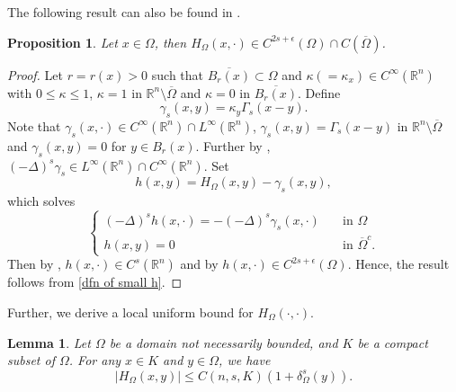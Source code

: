 \documentclass{amsart}
\newtheorem{lemma}[theorem]{Lemma}
\newtheorem{proposition}[theorem]{Proposition}
\newcommand{\R}{\mathbb{R}}
\newcommand{\slap}{(-\Delta)^{s}}
\newcommand{\rn}{\mathbb{R}^{n}}
\newcommand{\gk}[1]{\mathbb{G}_{#1}}
\begin{document}
The following result can also be found in \cite{Abatangelo2015LargesHarmonic}. 
\begin{proposition}
    Let $x\in \Omega$, then $H_{\Omega}(x,\cdot)\in C^{2s+\epsilon}(\Omega)\cap C(\overline{\Omega})$.
\end{proposition}
\begin{proof}
    Let $r=r(x)>0$ such that $\overline{B_{r}(x)}\subset \Omega$ and $\kappa(=\kappa_{x})\in C^{\infty}(\rn)$ with $0\leq \kappa\leq 1$, $\kappa=1$ in $\R^{n}\setminus\overline{\Omega}$ and $\kappa=0$ in $\overline{B_{r}(x)}$. Define 
    \begin{equation}\label{dfn small gamma s}
       \gamma_{s}(x,y)=\kappa_y\Gamma_{s}(x-y).
    \end{equation}
    Note that $\gamma_{s}(x,\cdot)\in C^{\infty}(\rn) \cap L^{\infty}(\rn)$, $\gamma_{s}(x,y)=\Gamma_{s}(x-y)$ in $\R^{n}\setminus\overline{\Omega}$ and $\gamma_{s}(x,y)=0$ for $y\in B_{r}(x)$. Further by \cite[Proposition 2.7]{Silvestre2007}, $\slap \gamma_{s}\in L^{\infty}(\rn)\cap C^{\infty}(\rn)$. Set 
    \begin{equation}\label{dfn of small h}
        h(x,y)=H_{\Omega}(x,y)-\gamma_{s}(x,y),
    \end{equation} which solves 
    \begin{equation*}
    \begin{cases}
      \slap h(x,\cdot)= -\slap \gamma_{s}(x,\cdot) \quad &\text{in } \Omega\\
      h(x,y)=0 &\text{in }\overline{\Omega}^{c}.
    \end{cases}
    \end{equation*}
    Then by \cite[Proposition 1.1]{ROSOTON2014275}, $h(x,\cdot)\in C^{s}(\rn)$ and by \cite[Proposition 2.8]{Silvestre2007} $h(x,\cdot)\in C^{2s+\epsilon}(\Omega)$. Hence, the result follows from \eqref{dfn of small h}.
\end{proof}
Further, we derive a local uniform bound for $H_{\Omega}(\cdot,\cdot)$. 
   \begin{lemma}\label{lemma uniform bound for H}
        Let $\Omega$ be a domain not necessarily bounded, and $K$ be a compact subset of  $\Omega$. For any $x\in K$ and $y\in \Omega$, we have
        \begin{equation*}
            |H_{\Omega}(x,y)|\leq C(n,s,K)\left(1+\delta_{\Omega}^{s}(y)\right).
        \end{equation*}
\end{lemma}
\end{document}

